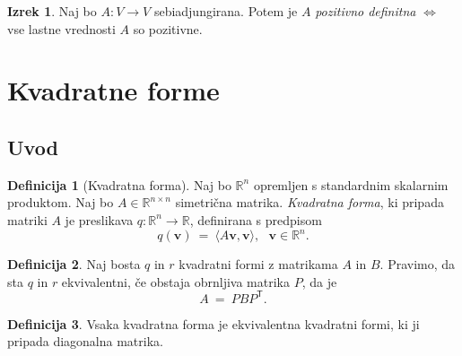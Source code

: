 \documentclass[11pt]{article}
\newcommand{\R}{\mathbb{R}}
\newcommand{\vv}{\mathbf{v}}
\newcommand{\0}{\mathbf{0}}
\renewcommand{\sp}[2]{\langle #1, #2 \rangle}
\newcommand{\T}{\mathsf{T}}
\theoremstyle{definition}
\newtheorem{definicija}{Definicija}[section]
\theoremstyle{definition}
\theoremstyle{definition}
\newtheorem{izrek}{Izrek}[section]
\theoremstyle{definition}
\begin{document}
\begin{izrek}

Naj bo $A: V \rightarrow V$ sebiadjungirana. Potem je $A$ \textit{pozitivno definitna} $\iff$ vse lastne vrednosti $A$ so pozitivne.

\end{izrek}
\vspace{0.5cm}


\pagebreak


\section{Kvadratne forme}
\vspace{0.5cm}


\subsection{Uvod}
\vspace{0.5cm}

\begin{definicija}[Kvadratna forma]

Naj bo $\R^n$ opremljen s standardnim skalarnim produktom. Naj bo $A \in \R^{n \times n}$ simetrična matrika. \textit{Kvadratna forma}, ki pripada matriki $A$ je preslikava $q: \R^n \rightarrow \R$, definirana s predpisom
$$q(\vv) ~=~ \sp{A\vv}{\vv}, ~~~\vv \in \R^n.$$

\end{definicija}
\vspace{0.5cm}

\begin{definicija}

Naj bosta $q$ in $r$ kvadratni formi z matrikama $A$ in $B$. Pravimo, da sta $q$ in $r$ ekvivalentni, če obstaja obrnljiva matrika $P$, da je
$$A ~=~ PBP^\T.$$

\end{definicija}
\vspace{0.5cm}

\begin{definicija}

Vsaka kvadratna forma je ekvivalentna kvadratni formi, ki ji pripada diagonalna matrika.

\end{definicija}
\vspace{0.5cm}
\end{document}
